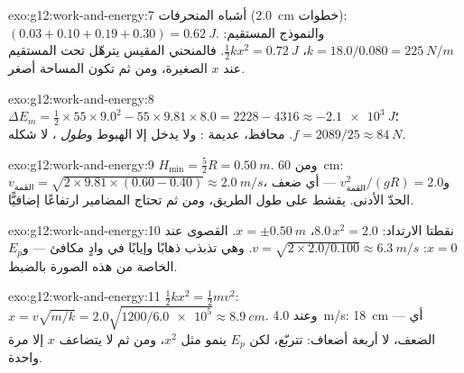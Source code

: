\begin{solution}{exo:g12:work-and-energy:7}
أشباه المنحرفات (\qty{2.0}{cm} خطوات): $(0.03 + 0.10 + 0.19 + 0.30) =
\qty{0.62}{J}$. والنموذج المستقيم: $k = 18.0/0.080 =
\qty{225}{N/m}$، $\tfrac12 kx^2 = \qty{0.72}{J}$. فالمنحني المقيس
يترهّل تحت المستقيم عند $x$ الصغيرة، ومن ثم تكون المساحة 
أصغر.
\end{solution}

\begin{solution}{exo:g12:work-and-energy:8}
$\Delta E_m = \tfrac12 \times 55 \times 9.0^2 - 55 \times 9.81 \times
8.0 = 2228 - 4316 \approx \qty{-2.1e3}{J}$؛
$f = 2089/25 \approx \qty{84}{N}$.  محافظ، 
عديمة : ولا يدخل إلا الهبوط و\emph{طول} ، لا
شكله.
\end{solution}

\begin{solution}{exo:g12:work-and-energy:9}
$H_{\min} = \tfrac52 R = \qty{0.50}{m}$. ومن \qty{60}{cm}:
$v_{\text{القمة}} = \sqrt{2 \times 9.81 \times (0.60 - 0.40)} \approx
\qty{2.0}{m/s}$، و$v_{\text{القمة}}^2/(gR) = 2.0$ --- أي ضعف
الحدّ الأدنى.  يقشط  على طول الطريق، ومن ثم تحتاج المضامير  ارتفاعًا
إضافيًّا.
\end{solution}

\begin{solution}{exo:g12:work-and-energy:10}
نقطتا الارتداد: $8.0\,x^2 = 2.0$، $x = \pm\qty{0.50}{m}$. 
القصوى عند $x = 0$: $v = \sqrt{2 \times 2.0/0.100} \approx
\qty{6.3}{m/s}$. وهي تذبذب ذهابًا وإيابًا في وادٍ مكافئ ---
و$E_p$ الخاصة  من هذه الصورة بالضبط.
\end{solution}

\begin{solution}{exo:g12:work-and-energy:11}
$\tfrac12 kx^2 = \tfrac12 mv^2$:
$x = v\sqrt{m/k} = 2.0\sqrt{1200/\num{6.0e5}} \approx \qty{8.9}{cm}$.
وعند \qty{4.0}{m/s}: \qty{18}{cm} --- أي الضعف، لا أربعة أضعاف: 
تتربّع، لكن $E_p$ ينمو مثل $x^2$، ومن ثم لا يتضاعف $x$ إلا مرة واحدة.
\end{solution}

